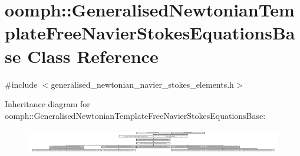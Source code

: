 \hypertarget{classoomph_1_1GeneralisedNewtonianTemplateFreeNavierStokesEquationsBase}{}\section{oomph\+:\+:Generalised\+Newtonian\+Template\+Free\+Navier\+Stokes\+Equations\+Base Class Reference}
\label{classoomph_1_1GeneralisedNewtonianTemplateFreeNavierStokesEquationsBase}


{\ttfamily \#include $<$generalised\+\_\+newtonian\+\_\+navier\+\_\+stokes\+\_\+elements.\+h$>$}

Inheritance diagram for oomph\+:\+:Generalised\+Newtonian\+Template\+Free\+Navier\+Stokes\+Equations\+Base\+:\begin{figure}[H]
\begin{center}
\leavevmode
\includegraphics[height=1.069042cm]{classoomph_1_1GeneralisedNewtonianTemplateFreeNavierStokesEquationsBase}
\end{center}
\end{figure}
